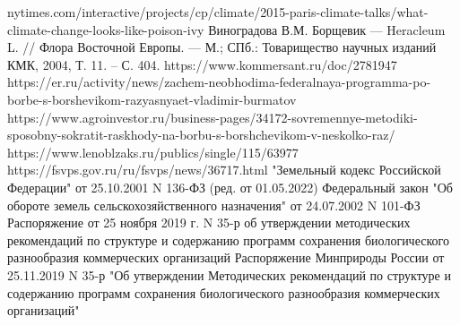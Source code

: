 \begin{thebibliography}{99}
	nytimes.com/interactive/projects/cp/climate/2015-paris-climate-talks/what-climate-change-looks-like-poison-ivy
	 Виноградова В.М. Борщевик — Heracleum L. // Флора Восточной Европы. — М.; СПб.: Товарищество научных изданий КМК, 2004, Т. 11. – С. 404.
	 https://www.kommersant.ru/doc/2781947
	 https://er.ru/activity/news/zachem-neobhodima-federalnaya-programma-po-borbe-s-borshevikom-razyasnyaet-vladimir-burmatov
	 https://www.agroinvestor.ru/business-pages/34172-sovremennye-metodiki-sposobny-sokratit-raskhody-na-borbu-s-borshchevikom-v-neskolko-raz/
	 https://www.lenoblzaks.ru/publics/single/115/63977
	 https://fsvps.gov.ru/ru/fsvps/news/36717.html
	 "Земельный кодекс Российской Федерации" от 25.10.2001 N 136-ФЗ (ред. от 01.05.2022)
	Федеральный закон "Об обороте земель сельскохозяйственного назначения" от 24.07.2002 N 101-ФЗ
	 Распоряжение от 25 ноября 2019 г. N 35-р об утверждении методических рекомендаций по структуре и содержанию программ сохранения биологического разнообразия коммерческих организаций	
	 Распоряжение Минприроды России от 25.11.2019 N 35-р "Об утверждении Методических рекомендаций по структуре и содержанию программ сохранения биологического разнообразия коммерческих организаций"
\end{thebibliography}
